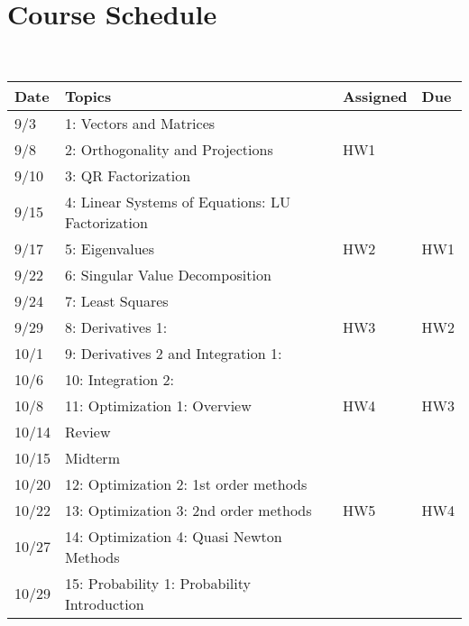 \documentclass[11pt]{article}
\begin{document}
\newpage
\section*{Course Schedule}

~\\
\small
\begin{centering}
\begin{tabular}{||l|p{3in}|l|l||}
\hline\hline
Date & Topics  & Assigned & Due  \\
\hline\hline
9/3 & 1: Vectors and Matrices &   & \\
\hline
9/8 & 2: Orthogonality and Projections & HW1   & \\
9/10& 3: QR Factorization &   & \\
\hline
9/15 &  4: Linear Systems of Equations: LU Factorization &  &  \\
9/17& 5: Eigenvalues & HW2 & HW1  \\
\hline
9/22& 6: Singular Value Decomposition &   &   \\
9/24 & 7: Least Squares  &  & \\
\hline
9/29 & 8:  Derivatives 1: & HW3 & HW2  \\ 
10/1 & 9: Derivatives 2 and Integration 1: & & \\
\hline
10/6 & 10: Integration 2: &  &  \\
10/8& 11: Optimization 1: Overview & HW4  & HW3  \\  
\hline 
10/14& Review &  &   \\
10/15 & Midterm& &\\
\hline
10/20 & 12: Optimization 2: 1st order methods   &  &\\
10/22 & 13: Optimization 3: 2nd order methods  &HW5  & HW4 \\ 
\hline
  
10/27 & 14: Optimization 4: Quasi Newton Methods & &  \\  
10/29& 15:  Probability 1: Probability Introduction  & & \\
\hline


\end{tabular}
\end{centering}
\end{document}
